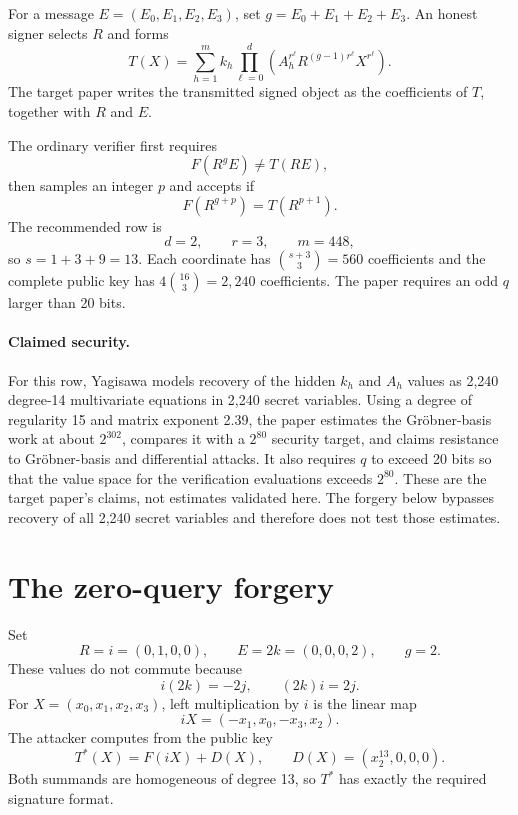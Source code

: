 \documentclass[10pt,a4paper]{article}
\begin{document}
For a message $E=(E_0,E_1,E_2,E_3)$, set
$g=E_0+E_1+E_2+E_3$.  An honest signer selects $R$ and forms
\begin{equation}
 T(X)=\sum_{h=1}^{m} k_h
       \prod_{\ell=0}^{d}
       \left(A_h^{r^\ell}R^{(g-1)r^\ell}X^{r^\ell}\right).
 \label{eq:T}
\end{equation}
The target paper writes the transmitted signed object as the coefficients of
$T$, together with $R$ and $E$.

The ordinary verifier first requires
\begin{equation}
 F(R^gE)\ne T(RE),
 \label{eq:inequality}
\end{equation}
then samples an integer $p$ and accepts if
\begin{equation}
 F(R^{g+p})=T(R^{p+1}).
 \label{eq:challenge}
\end{equation}
The recommended row is
\[
  d=2,\qquad r=3,\qquad m=448,
\]
so $s=1+3+9=13$.  Each coordinate has
$\binom{s+3}{3}=560$ coefficients and the complete public key has
$4\binom{16}{3}=2{,}240$ coefficients.  The paper requires an odd $q$ larger
than 20 bits.

\paragraph{Claimed security.}
For this row, Yagisawa models recovery of the hidden $k_h$ and $A_h$ values as
2,240 degree-14 multivariate equations in 2,240 secret variables.  Using a
degree of regularity 15 and matrix exponent 2.39, the paper estimates the
Gr\"obner-basis work at about $2^{302}$, compares it with a $2^{80}$ security
target, and claims resistance to Gr\"obner-basis and differential attacks.
It also requires $q$ to exceed 20 bits so that the value space for the
verification evaluations exceeds $2^{80}$.  These are the target paper's
claims, not estimates validated here.  The forgery below bypasses recovery of
all 2,240 secret variables and therefore does not test those estimates.

\section{The zero-query forgery}

Set
\[
 R=i=(0,1,0,0),\qquad E=2k=(0,0,0,2),\qquad g=2.
\]
These values do not commute because
\[
 i(2k)=-2j,\qquad (2k)i=2j.
\]
For $X=(x_0,x_1,x_2,x_3)$, left multiplication by $i$ is the linear map
\begin{equation}
 iX=(-x_1,x_0,-x_3,x_2).
 \label{eq:left-i}
\end{equation}
The attacker computes from the public key
\begin{equation}
 T^*(X)=F(iX)+D(X),
 \qquad D(X)=(x_2^{13},0,0,0).
 \label{eq:forgery}
\end{equation}
Both summands are homogeneous of degree 13, so $T^*$ has exactly the required
signature format.
\end{document}
